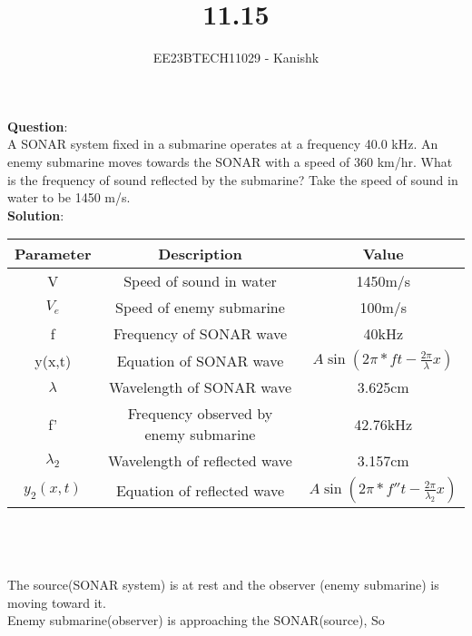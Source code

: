 \documentclass[journal,12pt,twocolumn]{IEEEtran}
\theoremstyle{remark}
\begin{document}

\vspace{3cm}

\title{11.15}
\author{EE23BTECH11029 - Kanishk}
\maketitle
\newpage

\bigskip

\renewcommand{\thefigure}{\theenumi}
\renewcommand{\thetable}{\theenumi}
\footnotesize
\textbf{Question}:\\ 

A SONAR system fixed in a submarine operates at a frequency 40.0 kHz. An enemy submarine moves towards the SONAR with a speed of 360 km/hr. What is the frequency of sound reflected by the submarine? Take the speed of sound in water to be 1450 m/s.\\

\textbf{Solution}:\\


\begin{tabular}{|c|c|c|}
   \hline
   Parameter & Description & Value\\
   \hline
   V & Speed of sound in water & 1450m/s\\
   \hline 
   $V_e$ & Speed of enemy submarine & 100m/s\\
   \hline 
   f & Frequency of SONAR wave & 40kHz\\ 
   \hline
   y(x,t) & Equation of SONAR wave & $A\sin(2\pi*ft-\frac{2\pi}{\lambda}x)$\\
   \hline
   $\lambda$ & Wavelength of SONAR wave & 3.625cm\\
    \hline
    f' & Frequency observed by enemy submarine & 42.76kHz\\
   \hline
   $\lambda_2$ & Wavelength of reflected wave & 3.157cm\\
   \hline 
   $ y_2(x,t)$ & Equation of reflected wave & $A\sin(2\pi*f''t-\frac{2\pi}{\lambda_2}x)$\\
   \hline
    

   
\end{tabular}   
\\
\\
\\
The source(SONAR system) is at rest and the observer (enemy submarine) is moving toward it. \\
Enemy submarine(observer) is approaching the SONAR(source), So 
\end{document}
